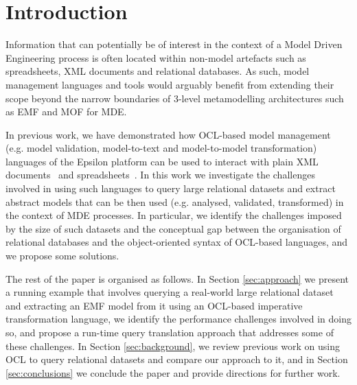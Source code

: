 \section{Introduction}

Information that can potentially be of interest in the context of a Model Driven Engineering process is often located within non-model artefacts such as spreadsheets, XML documents and relational databases. As such, model management languages and tools would arguably benefit from extending their scope beyond the narrow boundaries of 3-level metamodelling architectures such as EMF and MOF for MDE.

In previous work, we have demonstrated how OCL-based model management (e.g. model validation, model-to-text and model-to-model transformation) languages of the Epsilon platform \cite{EpsilonICECCS} can be used to interact with plain XML documents~\cite{EpsilonXML} and spreadsheets~\cite{EpsilonSpreadsheets}. In this work we investigate the challenges involved in using such languages to query large relational datasets and extract abstract models that can be then used (e.g. analysed, validated, transformed) in the context of MDE processes. In particular, we identify the challenges imposed by the size of such datasets and the conceptual gap between the organisation of relational databases and the object-oriented syntax of OCL-based languages, and we propose some solutions.

The rest of the paper is organised as follows. In Section \ref{sec:approach} we present a running example that involves querying a real-world large relational dataset and extracting an EMF model from it using an OCL-based imperative transformation language, we identify the performance challenges involved in doing so, and propose a run-time query translation approach that addresses some of these challenges. In Section \ref{sec:background}, we review previous work on using OCL to query relational datasets and compare our approach to it, and in Section \ref{sec:conclusions} we conclude the paper and provide directions for further work.